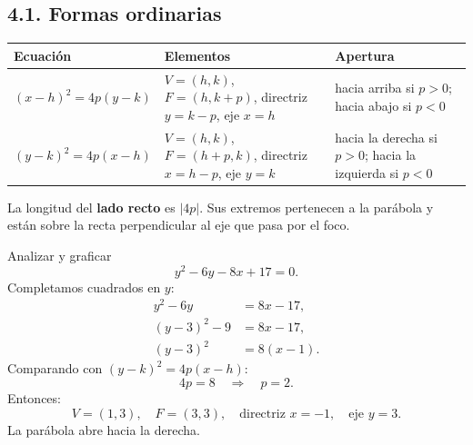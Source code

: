 \documentclass[11pt]{article}
\begin{document}
\subsection*{4.1. Formas ordinarias}

\begin{center}
\renewcommand{\arraystretch}{1.45}
\begin{tabular}{m{50mm}|m{50mm}|m{50mm}}
\toprule
Ecuación & Elementos & Apertura \\
\midrule
$\displaystyle (x-h)^2=4p(y-k)$
& $V=(h,k)$, $F=(h,k+p)$, directriz $y=k-p$, eje $x=h$
& hacia arriba si $p>0$; hacia abajo si $p<0$ \\
\midrule
$\displaystyle (y-k)^2=4p(x-h)$
& $V=(h,k)$, $F=(h+p,k)$, directriz $x=h-p$, eje $y=k$
& hacia la derecha si $p>0$; hacia la izquierda si $p<0$ \\
\bottomrule
\end{tabular}
\end{center}

La longitud del \textbf{lado recto} es $|4p|$. Sus extremos pertenecen a la parábola y están sobre la recta perpendicular al eje que pasa por el foco.

\begin{center}
\end{center}

\begin{mdframed}[style=EjerSty,frametitle={Ejemplo resuelto}]
Analizar y graficar
\[
y^2-6y-8x+17=0.
\]
Completamos cuadrados en $y$:
\begin{align*}
y^2-6y&=8x-17,\\
(y-3)^2-9&=8x-17,\\
(y-3)^2&=8(x-1).
\end{align*}
Comparando con $(y-k)^2=4p(x-h)$:
\[
4p=8\quad\Longrightarrow\quad p=2.
\]
Entonces:
\[
\boxed{V=(1,3),\quad F=(3,3),\quad \text{directriz }x=-1,\quad \text{eje }y=3.}
\]
La parábola abre hacia la derecha.
\end{mdframed}
\end{document}
